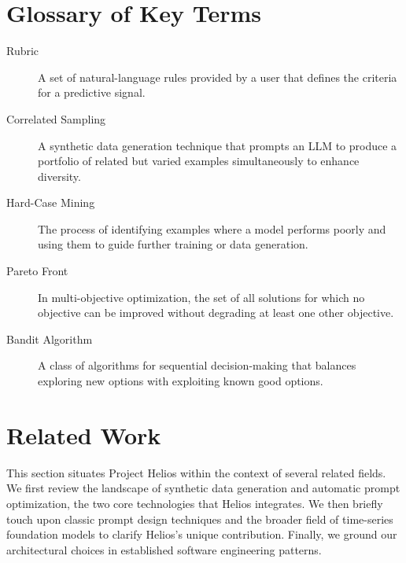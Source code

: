 \documentclass{article}
\begin{document}
\section{Glossary of Key Terms}
\begin{description}
  \item[Rubric] A set of natural-language rules provided by a user that defines the criteria for a predictive signal.
  \item[Correlated Sampling] A synthetic data generation technique that prompts an LLM to produce a portfolio of related but varied examples simultaneously to enhance diversity.
  \item[Hard-Case Mining] The process of identifying examples where a model performs poorly and using them to guide further training or data generation.
  \item[Pareto Front] In multi-objective optimization, the set of all solutions for which no objective can be improved without degrading at least one other objective.
  \item[Bandit Algorithm] A class of algorithms for sequential decision-making that balances exploring new options with exploiting known good options.
\end{description}

\section{Related Work}
\label{sec:relatedwork}
This section situates Project Helios within the context of several related fields. We first review the landscape of synthetic data generation and automatic prompt optimization, the two core technologies that Helios integrates. We then briefly touch upon classic prompt design techniques and the broader field of time-series foundation models to clarify Helios's unique contribution. Finally, we ground our architectural choices in established software engineering patterns.
\end{document}

